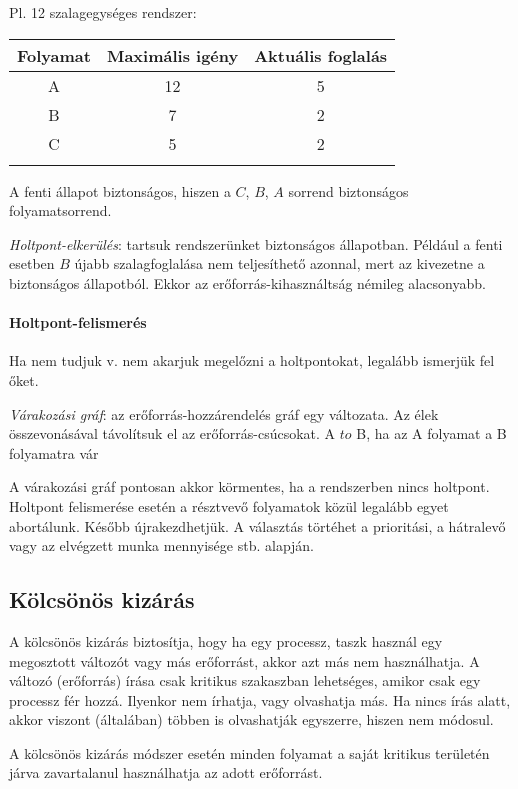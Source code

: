\documentclass[fleqn,10pt,a4paper]{article}
\theoremstyle{magyar}
\begin{document}
  Pl. 12 szalagegységes rendszer:\\
  
  \begin{tabular}{@{}ccc@{}} \toprule
    Folyamat & Maximális igény & Aktuális foglalás\\ \midrule
    A & 12 & 5\\
    B & 7 & 2\\
    C & 5 & 2\\\bottomrule\\
  \end{tabular}
  
  A fenti állapot biztonságos, hiszen a $C$, $B$, $A$ sorrend biztonságos folyamatsorrend.
  
  \emph{Holtpont-elkerülés}: tartsuk rendszerünket biztonságos állapotban. Például a fenti esetben $B$ újabb
  szalagfoglalása nem teljesíthető azonnal, mert az kivezetne a biztonságos állapotból. Ekkor az erőforrás-kihasználtság
  némileg alacsonyabb.


  \paragraph{Holtpont-felismerés} Ha nem tudjuk v. nem akarjuk megelőzni a holtpontokat, legalább ismerjük fel őket.

  \emph{Várakozási gráf}: az erőforrás-hozzárendelés gráf egy változata. Az élek összevonásával távolítsuk el az
  erőforrás-csúcsokat. A $to$ B, ha az A folyamat a B folyamatra vár
  
  A várakozási gráf pontosan akkor körmentes, ha a rendszerben nincs holtpont. Holtpont felismerése esetén a résztvevő
  folyamatok közül legalább egyet abortálunk. Később újrakezdhetjük. A választás törtéhet a prioritási, a hátralevő
  vagy az elvégzett munka mennyisége stb. alapján.
  
  \subsection{Kölcsönös kizárás}
  
  A kölcsönös kizárás biztosítja, hogy ha egy processz, taszk használ egy megosztott változót vagy más erőforrást, akkor
  azt más nem használhatja. A változó (erőforrás) írása csak kritikus szakaszban lehetséges, amikor csak egy processz
  fér hozzá. Ilyenkor nem írhatja, vagy olvashatja más. Ha nincs írás alatt, akkor viszont (általában) többen is olvashatják 
  egyszerre, hiszen nem módosul.
  
  A kölcsönös kizárás módszer esetén minden folyamat a saját kritikus területén járva zavartalanul használhatja az adott erőforrást.
\end{document}
